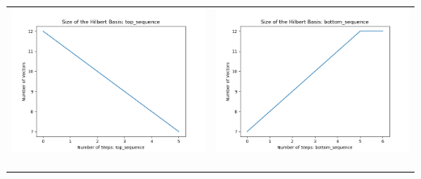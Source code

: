 \documentclass[10pt]{article}
\begin{document}
\begin{tabular}{c|c}
\begin{minipage}{.45\textwidth}
\includegraphics[width=\textwidth]{"DATA/5d/6 generators 1 bound E/top_sequence SIZE"}
\end{minipage} &
\begin{minipage}{.45\textwidth}
\includegraphics[width=\textwidth]{"DATA/5d/6 generators 1 bound E bottomup/bottom_sequence SIZE"}
\end{minipage} \\ \\
\hline \\\begin{minipage}{.45\textwidth}

\end{minipage}
\end{tabular}
\end{document}
